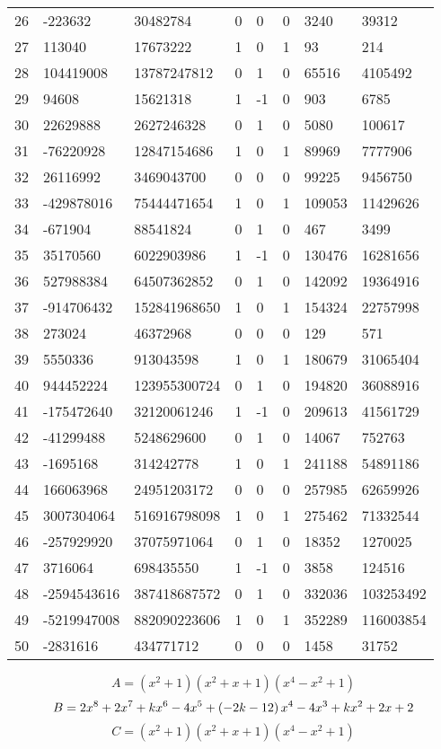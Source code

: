 \documentclass{amsart}
\begin{document}
\begin{longtable}{|l|l|l|lllll|}
26&-223632&30482784&0&0&0&3240&39312\\
27&113040&17673222&1&0&1&93&214\\
28&104419008&13787247812&0&1&0&65516&4105492\\
29&94608&15621318&1&-1&0&903&6785\\
30&22629888&2627246328&0&1&0&5080&100617\\
31&-76220928&12847154686&1&0&1&89969&7777906\\
32&26116992&3469043700&0&0&0&99225&9456750\\
33&-429878016&75444471654&1&0&1&109053&11429626\\
34&-671904&88541824&0&1&0&467&3499\\
35&35170560&6022903986&1&-1&0&130476&16281656\\
36&527988384&64507362852&0&1&0&142092&19364916\\
37&-914706432&152841968650&1&0&1&154324&22757998\\
38&273024&46372968&0&0&0&129&571\\
39&5550336&913043598&1&0&1&180679&31065404\\
40&944452224&123955300724&0&1&0&194820&36088916\\
41&-175472640&32120061246&1&-1&0&209613&41561729\\
42&-41299488&5248629600&0&1&0&14067&752763\\
43&-1695168&314242778&1&0&1&241188&54891186\\
44&166063968&24951203172&0&0&0&257985&62659926\\
45&3007304064&516916798098&1&0&1&275462&71332544\\
46&-257929920&37075971064&0&1&0&18352&1270025\\
47&3716064&698435550&1&-1&0&3858&124516\\
48&-2594543616&387418687572&0&1&0&332036&103253492\\
49&-5219947008&882090223606&1&0&1&352289&116003854\\
50&-2831616&434771712&0&0&0&1458&31752\\
\hline
\end{longtable}
$$A=(x^2
 + 1)(x^2
 + x
 + 1)(x^4
 - x^2
 + 1)$$
$$B=2\*x^8
 + 2\*x^7
 + k\*x^6
 - 4\*x^5
 + \left(-2\*k
 - 12\right) \*x^4
 - 4\*x^3
 + k\*x^2
 + 2\*x
 + 2$$
$$C=(x^2
 + 1)(x^2
 + x
 + 1)(x^4
 - x^2
 + 1)$$
\end{document}
